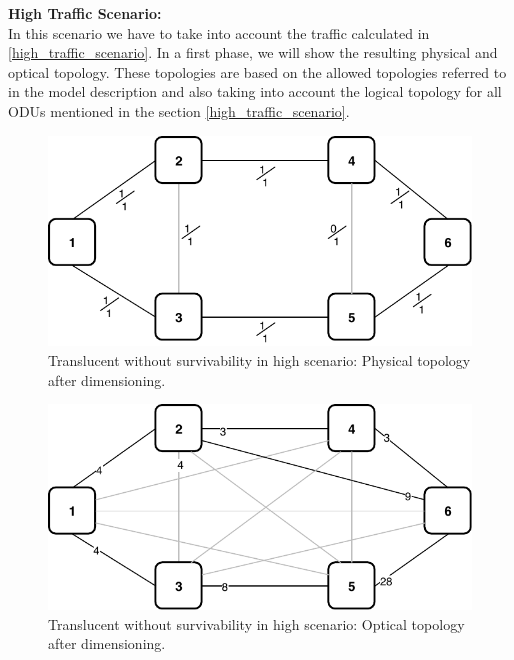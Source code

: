 \newpage
\textbf{High Traffic Scenario:}\\

In this scenario we have to take into account the traffic calculated in \ref{high_traffic_scenario}. In a first phase, we will show the resulting physical and optical topology. These topologies are based on the allowed topologies referred to in the model description and also taking into account the logical topology for all ODUs mentioned in the section \ref{high_traffic_scenario}.\\

\begin{figure}[h!]
\centering
\includegraphics[width=12cm]{sdf/ilp/translucent_survivability/figures/physical_topology_high}
\caption{Translucent without survivability in high scenario: Physical topology after dimensioning.}
\label{physical3_high}
\end{figure}

\begin{figure}[h!]
\centering
\includegraphics[width=12cm]{sdf/ilp/translucent_survivability/figures/optical_topology_high}
\caption{Translucent without survivability in high scenario: Optical topology after dimensioning.}
\label{optical3_high}
\end{figure}

